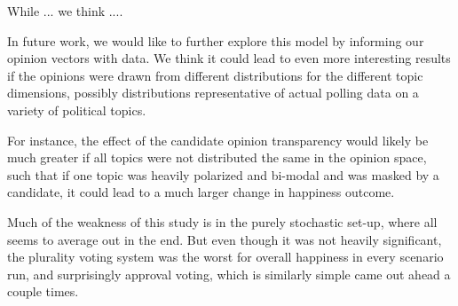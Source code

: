 
While ... we think ....

In future work, we would like to further explore this model by informing our opinion vectors with data.
We think it could lead to even more interesting results if the opinions were drawn from different distributions for the different topic dimensions, possibly distributions representative of actual polling data on a variety of political topics.

For instance, the effect of the candidate opinion transparency would likely be much greater if all topics were not distributed the same in the opinion space, such that if one topic was heavily polarized and bi-modal and was masked by a candidate, it could lead to a much larger change in happiness outcome.

Much of the weakness of this study is in the purely stochastic set-up, where all seems to average out in the end.
But even though it was not heavily significant, the plurality voting system was the worst for overall happiness in every scenario run, and surprisingly approval voting, which is similarly simple came out ahead a couple times.
